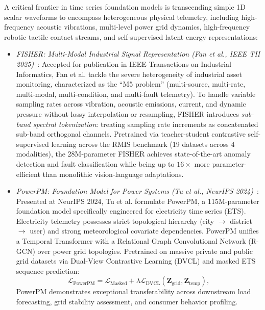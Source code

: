 A critical frontier in time series foundation models is transcending simple 1D scalar waveforms to encompass heterogeneous physical telemetry, including high-frequency acoustic vibrations, multi-level power grid dynamics, high-frequency robotic tactile contact streams, and self-supervised latent energy representations:

\begin{itemize}[leftmargin=*]
    \item \emph{FISHER: Multi-Modal Industrial Signal Representation (Fan et al., IEEE TII 2025)}~\cite{fan2025fisher}: Accepted for publication in IEEE Transactions on Industrial Informatics, Fan et al. tackle the severe heterogeneity of industrial asset monitoring, characterized as the ``M5 problem'' (multi-source, multi-rate, multi-modal, multi-condition, and multi-fault telemetry). To handle variable sampling rates across vibration, acoustic emissions, current, and dynamic pressure without lossy interpolation or resampling, FISHER introduces \emph{sub-band spectral tokenization}: treating sampling rate increments as concatenated sub-band orthogonal channels. Pretrained via teacher-student contrastive self-supervised learning across the RMIS benchmark (19 datasets across 4 modalities), the 28M-parameter FISHER achieves state-of-the-art anomaly detection and fault classification while being up to $16\times$ more parameter-efficient than monolithic vision-language adaptations.

    \item \emph{PowerPM: Foundation Model for Power Systems (Tu et al., NeurIPS 2024)}~\cite{tu2024powerpm}: Presented at NeurIPS 2024, Tu et al. formulate PowerPM, a 115M-parameter foundation model specifically engineered for electricity time series (ETS). Electricity telemetry possesses strict topological hierarchy (city $\to$ district $\to$ user) and strong meteorological covariate dependencies. PowerPM unifies a Temporal Transformer with a Relational Graph Convolutional Network (R-GCN) over power grid topologies. Pretrained on massive private and public grid datasets via Dual-View Contrastive Learning (DVCL) and masked ETS sequence prediction:
    \begin{equation}
        \mathcal{L}_{\text{PowerPM}} = \mathcal{L}_{\text{Masked}} + \lambda \mathcal{L}_{\text{DVCL}}(\mathbf{Z}_{\text{grid}}, \mathbf{Z}_{\text{temp}}),
    \end{equation}
    PowerPM demonstrates exceptional transferability across downstream load forecasting, grid stability assessment, and consumer behavior profiling.


\end{itemize}
